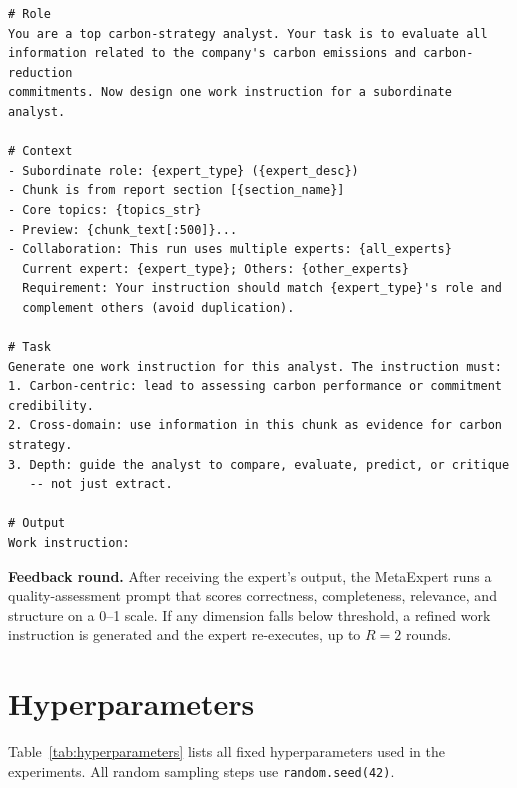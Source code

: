 \documentclass[sigconf,nonacm]{acmart}
\begin{document}
\begin{lstlisting}
# Role
You are a top carbon-strategy analyst. Your task is to evaluate all
information related to the company's carbon emissions and carbon-reduction
commitments. Now design one work instruction for a subordinate analyst.

# Context
- Subordinate role: {expert_type} ({expert_desc})
- Chunk is from report section [{section_name}]
- Core topics: {topics_str}
- Preview: {chunk_text[:500]}...
- Collaboration: This run uses multiple experts: {all_experts}
  Current expert: {expert_type}; Others: {other_experts}
  Requirement: Your instruction should match {expert_type}'s role and
  complement others (avoid duplication).

# Task
Generate one work instruction for this analyst. The instruction must:
1. Carbon-centric: lead to assessing carbon performance or commitment credibility.
2. Cross-domain: use information in this chunk as evidence for carbon strategy.
3. Depth: guide the analyst to compare, evaluate, predict, or critique
   -- not just extract.

# Output
Work instruction:
\end{lstlisting}

\noindent\textbf{Feedback round.} After receiving the expert's output, the MetaExpert runs a quality-assessment prompt that scores correctness, completeness, relevance, and structure on a 0--1 scale. If any dimension falls below threshold, a refined work instruction is generated and the expert re-executes, up to $R=2$ rounds.

\section{Hyperparameters}

Table~\ref{tab:hyperparameters} lists all fixed hyperparameters used in the experiments. All random sampling steps use \texttt{random.seed(42)}.
\end{document}
